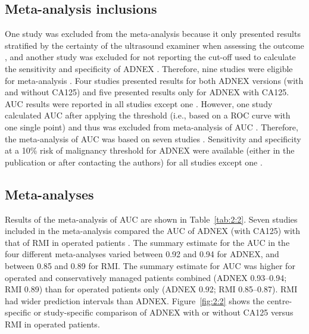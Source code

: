 \subsection{Meta-analysis inclusions}
One study was excluded from the meta-analysis because it only presented results
stratified by the certainty of the ultrasound examiner when assessing the outcome
 \cite{szubertPerformanceSelectedModels2020}, and another study was excluded for not
reporting the cut-off used to calculate the sensitivity and specificity of \gls{ADNEX}
 \cite{ounPreoperativeRiskAssessment2023}. Therefore, nine studies were eligible for
meta-analysis
 \cite{vancalsterValidationModelsDiagnose2020,diazOvarianTumorsRisk2017a,tugPreoperativeDiscriminatingPerformance2020,behnamfarComparisonUltrasoundTumor2022,meysEstimatingRiskMalignancy2017,qianComparisonDiagnosticPerformances2021,sandalComparisionRiskMalignancy2018a,wangEvaluatingRiskMalignancy2023,borgesProspectiveExternalValidation2024}.
Four studies presented results for both \gls{ADNEX} versions (with and without CA125) and
five presented results only for \gls{ADNEX} with CA125. \gls{AUC} results were reported in all
studies except one \cite{sandalComparisionRiskMalignancy2018a}. However, one study
calculated \gls{AUC} after applying the threshold (i.e., based on a \gls{ROC} curve with one
single point) and thus was excluded from meta-analysis of \gls{AUC}
 \cite{wangEvaluatingRiskMalignancy2023}. Therefore, the meta-analysis of \gls{AUC} was
based on seven studies
 \cite{vancalsterValidationModelsDiagnose2020,diazOvarianTumorsRisk2017a,tugPreoperativeDiscriminatingPerformance2020,behnamfarComparisonUltrasoundTumor2022,meysEstimatingRiskMalignancy2017,qianComparisonDiagnosticPerformances2021,borgesProspectiveExternalValidation2024}.
Sensitivity and specificity at a 10\% risk of malignancy threshold for \gls{ADNEX} were
available (either in the publication or after contacting the authors) for all studies
except one \cite{behnamfarComparisonUltrasoundTumor2022}.

\subsection{Meta-analyses}
Results of the meta-analysis of \gls{AUC} are shown in Table~\ref{tab:2:2}. Seven studies included in
the meta-analysis compared the \gls{AUC} of \gls{ADNEX} (with CA125) with that of \gls{RMI} in
operated patients
 \cite{vancalsterValidationModelsDiagnose2020,diazOvarianTumorsRisk2017a,tugPreoperativeDiscriminatingPerformance2020,behnamfarComparisonUltrasoundTumor2022,meysEstimatingRiskMalignancy2017,qianComparisonDiagnosticPerformances2021,borgesProspectiveExternalValidation2024}.
The summary estimate for the \gls{AUC} in the four different meta-analyses varied between
0.92 and 0.94 for \gls{ADNEX}, and between 0.85 and 0.89 for \gls{RMI}. The summary estimate
for \gls{AUC} was higher for operated and conservatively managed patients combined (\gls{ADNEX}
0.93--0.94; \gls{RMI} 0.89) than for operated patients only (\gls{ADNEX} 0.92; \gls{RMI} 0.85--0.87).
\gls{RMI} had wider prediction intervals than \gls{ADNEX}. Figure~\ref{fig:2:2} shows the centre-specific or
study-specific comparison of \gls{ADNEX} with or without CA125 versus \gls{RMI} in operated
patients.

